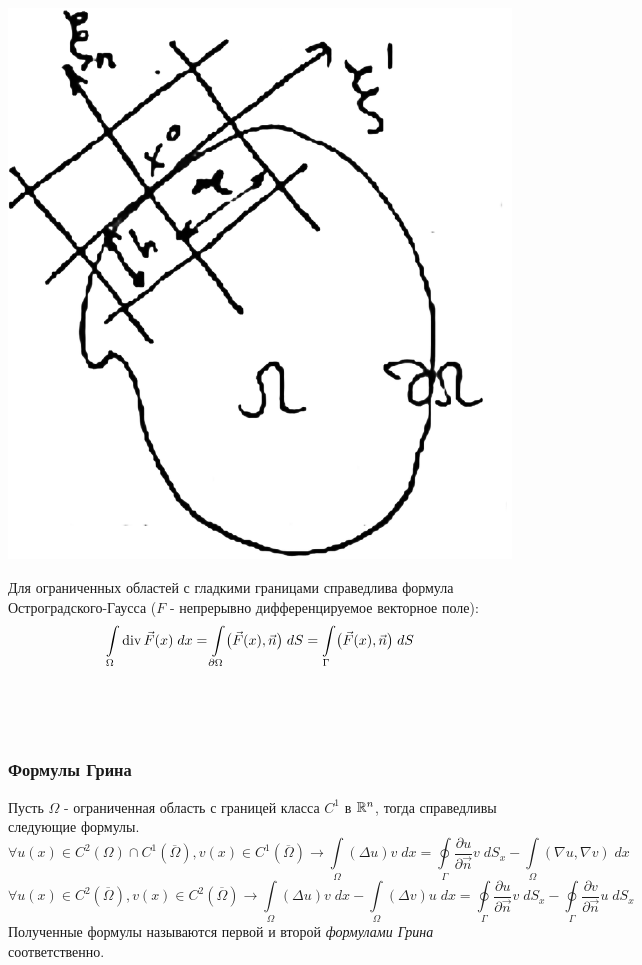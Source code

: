 \begin{minipage}{0.3\textwidth}
\begin{center}
\includegraphics[scale = 0.2]{14_1_new}
\end{center}
\end{minipage}
\begin{minipage}{0.8\textwidth}
Для ограниченных областей с гладкими границами справедлива формула Остроградского-Гаусса ($F$ - непрерывно дифференцируемое векторное поле):
$$\int\limits_{\Omega} \operatorname{div} \vec{F}(x)\;dx = \int\limits_{\partial \Omega} \bigl(\vec{F}(x), \vec{n}\bigr)\;dS = \int\limits_{\Gamma} \bigl(\vec{F}(x), \vec{n}\bigr)\;dS$$
\end{minipage} \\
\begin{lemma} \ \\
\subsubsection{Формулы Грина}
Пусть $\Omega$ - ограниченная область с границей класса $C^1$ в $\mathbb{R}^n$, тогда справедливы следующие формулы.
	$$\forall u(x) \in C^2(\Omega)\cap C^1(\overline{\Omega}), v(x) \in C^1(\overline{\Omega}) \to \int\limits_{\Omega} (\Delta u)v\; dx = \oint\limits_{\Gamma} \dfrac{\partial u}{\partial \vec{n}} v\;dS_x - \int\limits_{\Omega}(\nabla u, \nabla v)\;dx $$
$$ \forall u(x) \in C^2(\overline{\Omega}), v(x) \in C^2(\overline{\Omega}) \to \int\limits_{\Omega} (\Delta u)v\; dx - \int\limits_{\Omega} (\Delta v)u\; dx = \oint\limits_{\Gamma} \dfrac{\partial u}{\partial \vec{n}} v\;dS_x - \oint\limits_{\Gamma} \dfrac{\partial v}{\partial \vec{n}} u\;dS_x$$
Полученные формулы называются первой и второй\; \textit{формулами Грина} соответственно.
\end{lemma}
